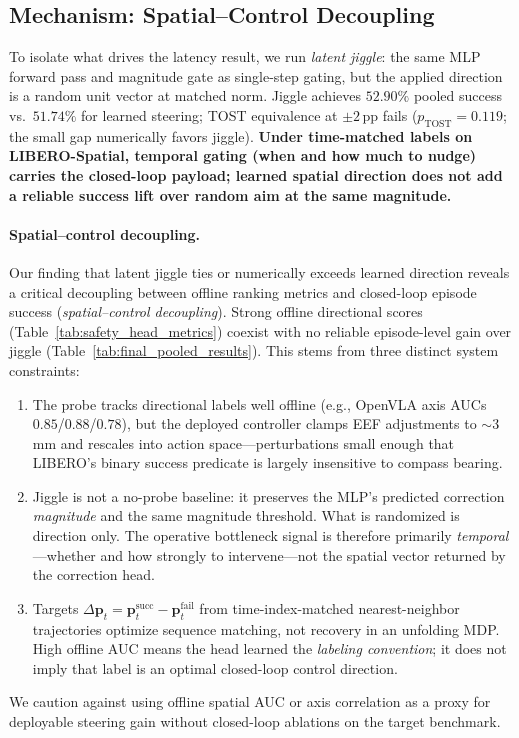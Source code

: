 \subsection{Mechanism: Spatial--Control Decoupling}
\label{sec:mechanism}

To isolate what drives the latency result, we run \emph{latent jiggle}: the same MLP forward pass and magnitude gate as single-step gating, but the applied direction is a random unit vector at matched norm. Jiggle achieves $52.90\%$ pooled success vs.\ $51.74\%$ for learned steering; TOST equivalence at ${\pm}2$\,pp fails ($p_{\mathrm{TOST}}{=}0.119$; the small gap numerically favors jiggle). \textbf{Under time-matched labels on LIBERO-Spatial, temporal gating (when and how much to nudge) carries the closed-loop payload; learned spatial direction does not add a reliable success lift over random aim at the same magnitude.}

\paragraph{Spatial--control decoupling.}
Our finding that latent jiggle ties or numerically exceeds learned direction reveals a critical decoupling between offline ranking metrics and closed-loop episode success (\emph{spatial--control decoupling}). Strong offline directional scores (Table~\ref{tab:safety_head_metrics}) coexist with no reliable episode-level gain over jiggle (Table~\ref{tab:final_pooled_results}). This stems from three distinct system constraints:
\begin{enumerate}[leftmargin=1.4em, topsep=2pt, itemsep=2pt]
    \item[\textbf{(i) Scale mismatch.}] The probe tracks directional labels well offline (e.g., OpenVLA axis AUCs $0.85$/$0.88$/$0.78$), but the deployed controller clamps EEF adjustments to $\sim$3\,mm and rescales into action space---perturbations small enough that LIBERO's binary success predicate is largely insensitive to compass bearing.
    \item[\textbf{(ii) Shared magnitude gate.}] Jiggle is not a no-probe baseline: it preserves the MLP's predicted correction \emph{magnitude} and the same magnitude threshold. What is randomized is direction only. The operative bottleneck signal is therefore primarily \emph{temporal}---whether and how strongly to intervene---not the spatial vector returned by the correction head.
    \item[\textbf{(iii) Label vs.\ recovery.}] Targets $\Delta\mathbf{p}_t = \mathbf{p}^{\mathrm{succ}}_t - \mathbf{p}^{\mathrm{fail}}_t$ from time-index-matched nearest-neighbor trajectories optimize sequence matching, not recovery in an unfolding MDP. High offline AUC means the head learned the \emph{labeling convention}; it does not imply that label is an optimal closed-loop control direction.
\end{enumerate}
We caution against using offline spatial AUC or axis correlation as a proxy for deployable steering gain without closed-loop ablations on the target benchmark.

